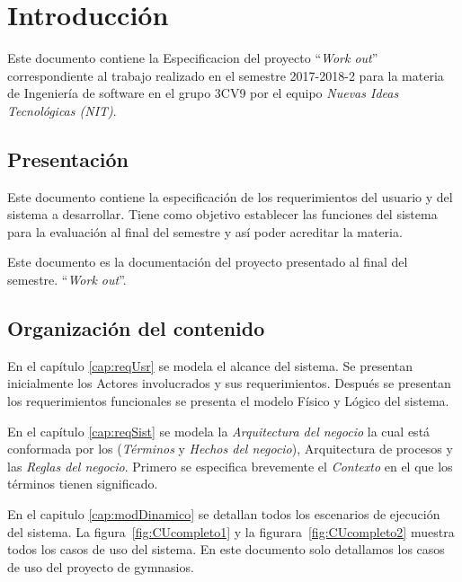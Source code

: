\chapter{Introducción}


	Este documento contiene la Especificacion del proyecto ``{\em Work out}'' correspondiente al trabajo realizado en el semestre 2017-2018-2 para la materia de Ingeniería de software en el grupo 3CV9 por el equipo {\em Nuevas Ideas Tecnológicas (NIT)}.

\section{Presentación}


	Este documento contiene la especificación de los requerimientos del usuario y del sistema a desarrollar. Tiene como objetivo establecer las funciones del sistema para la evaluación al final del semestre y así poder acreditar la materia. 
	
	Este documento es la documentación del proyecto presentado al final del semestre. ``{\em Work out}''.
	
\section{Organización del contenido}

	En el capítulo \ref{cap:reqUsr} se modela el alcance del sistema. Se presentan inicialmente los Actores involucrados y sus requerimientos. Después se presentan los requerimientos funcionales se presenta el modelo Físico y Lógico del sistema.
	
	En el capítulo \ref{cap:reqSist} se modela la {\em Arquitectura del negocio} la cual está conformada por los ({\em Términos} y {\em Hechos del negocio}), Arquitectura de procesos y las {\em Reglas del negocio}. Primero se especifica brevemente el {\em Contexto} en el que los términos tienen significado.
	
	En el capitulo \ref{cap:modDinamico} se detallan todos los escenarios de ejecución del sistema. La figura~\ref{fig:CUcompleto1}  y la figurara~\ref{fig:CUcompleto2} muestra todos los casos de uso del sistema. En este documento solo detallamos los casos de uso del proyecto de gymnasios.
	
